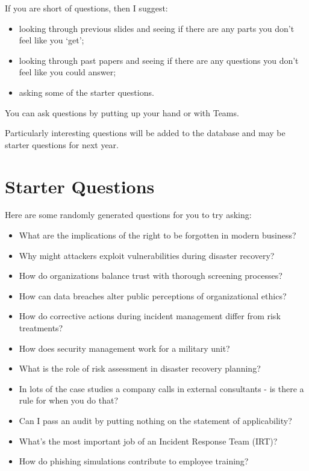 \documentclass[12pt]{article}
\begin{document}
If you are short of questions, then I suggest: 

\begin{itemize} 
\item looking through previous slides and seeing if there are any parts you don't feel like you `get';
\item looking through past papers and seeing if there are any questions you don't feel like you could answer;
\item asking some of the starter questions.
\end{itemize} 

You can ask questions by putting up your hand or with Teams.  

Particularly interesting questions will be added to the database and may be starter questions for next year.  

\section*{Starter Questions} 
Here are some randomly generated questions for you to try asking: 

\begin{itemize}
  \item What are the implications of the right to be forgotten in modern business?
  \item Why might attackers exploit vulnerabilities during disaster recovery?
  \item How do organizations balance trust with thorough screening processes?
  \item How can data breaches alter public perceptions of organizational ethics?
  \item How do corrective actions during incident management differ from risk treatments?
  \item How does security management work for a military unit?
  \item What is the role of risk assessment in disaster recovery planning?
  \item In lots of the case studies a company calls in external consultants - is there a rule for when you do that?
  \item Can I pass an audit by putting nothing on the statement of applicability?
  \item What's the most important job of an Incident Response Team (IRT)?
  \item How do phishing simulations contribute to employee training?
\end{itemize}
\end{document}

